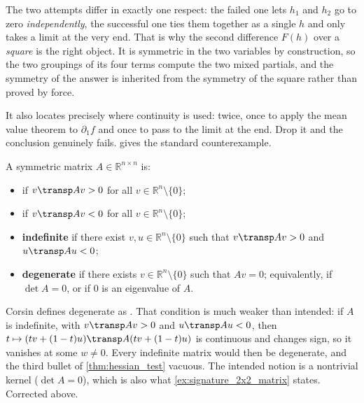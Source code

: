 \begin{remark}
\label{rem:why_schwarz_needs_care}
The two attempts differ in exactly one respect: the failed one lets $h_1$ and $h_2$ go to zero
\emph{independently}, the successful one ties them together as a single $h$ and only takes a
limit at the very end. That is why the second difference $F(h)$ over a \emph{square} is the
right object. It is symmetric in the two variables by construction, so the two groupings of its
four terms compute the two mixed partials, and the symmetry of the answer is inherited from the
symmetry of the square rather than proved by force.

It also locates precisely where continuity is used: twice, once to apply the mean value theorem
to $\partial_1f$ and once to pass to the limit at the end. Drop it and the conclusion genuinely
fails.  gives the standard counterexample.
\end{remark}

\begin{definition}
\label{def:sign_symmetric_matrix}
A symmetric matrix $A \in \mathbb{R}^{n\times n}$ is:
\begin{itemize}
  \item {}  if $v\transp Av > 0$ for all
    $v \in \mathbb{R}^n\setminus\{0\}$;
  \item {}  if $v\transp Av < 0$ for all
    $v \in \mathbb{R}^n\setminus\{0\}$;
  \item \textbf{indefinite} if there exist $v, u \in \mathbb{R}^n\setminus\{0\}$ such that
    $v\transp Av > 0$ and $u\transp Au < 0$;
  \item \textbf{degenerate}  if there exists
    $v \in \mathbb{R}^n\setminus\{0\}$ such that $Av = 0$; equivalently, if $\det A = 0$, or
    if $0$ is an eigenvalue of $A$.
\end{itemize}
\end{definition}

\begin{ainote}
Corsin defines degenerate as . That
condition is much weaker than intended: if $A$ is indefinite, with $v\transp Av > 0$ and
$u\transp Au < 0$, then $t \mapsto (tv+(1-t)u)\transp A(tv+(1-t)u)$ is continuous and changes
sign, so it vanishes at some $w \neq 0$. Every indefinite matrix would then be degenerate, and
the third bullet of \cref{thm:hessian_test} vacuous. The intended notion is a nontrivial kernel
($\det A = 0$), which is also what \cref{ex:signature_2x2_matrix} states. Corrected above.
\end{ainote}

